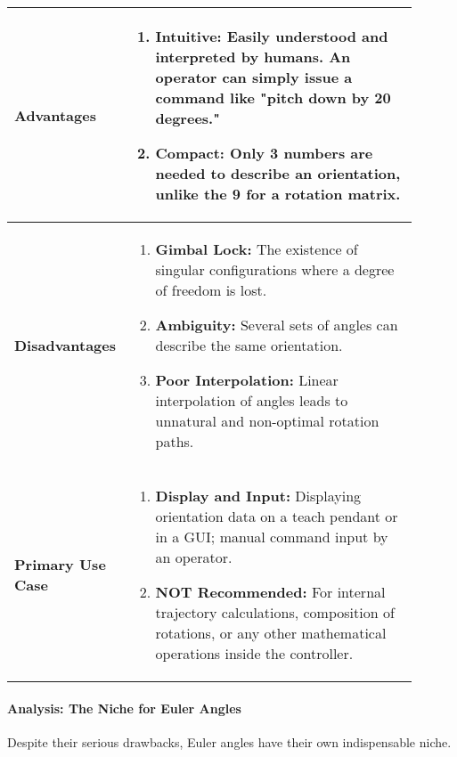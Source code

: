 \begin{longtable}{p{0.2\linewidth} p{0.7\linewidth}}
    \textbf{Advantages} &
    \vspace{-20pt} %
    \begin{enumerate}
        \item \textbf{Intuitive:} Easily understood and interpreted by humans. An operator can simply issue a command like "pitch down by 20 degrees."
        \item \textbf{Compact:} Only 3 numbers are needed to describe an orientation, unlike the 9 for a rotation matrix.
    \end{enumerate}
    \vspace{-20pt} %
    \\
    \midrule %
    \textbf{Disadvantages} &
    \vspace{-20pt} %
    \begin{enumerate}
        \item \textbf{Gimbal Lock:} The existence of singular configurations where a degree of freedom is lost.
        \item \textbf{Ambiguity:} Several sets of angles can describe the same orientation.
        \item \textbf{Poor Interpolation:} Linear interpolation of angles leads to unnatural and non-optimal rotation paths.
    \end{enumerate}
    \vspace{-20pt} %
    \\
    \midrule %
    \textbf{Primary Use Case} &
    \vspace{-20pt} %
    \begin{enumerate}
        \item \textbf{Display and Input:} Displaying orientation data on a teach pendant or in a GUI; manual command input by an operator.
        \item \textbf{NOT Recommended:} For internal trajectory calculations, composition of rotations, or any other mathematical operations inside the controller.
    \end{enumerate}
    \vspace{-20pt} %
    \\
\end{longtable}



\paragraph{Analysis: The Niche for Euler Angles}
Despite their serious drawbacks, Euler angles have their own indispensable niche.


